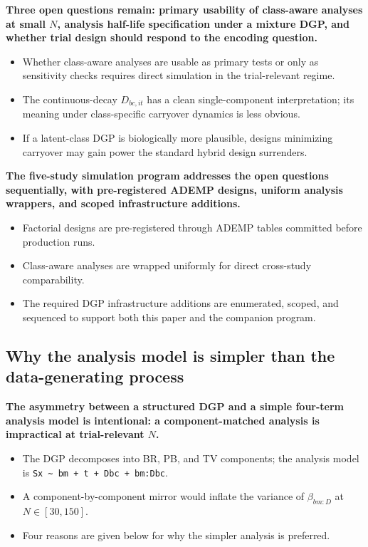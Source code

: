 \documentclass[
  11pt,
]{article}
\begin{document}
\textbf{Three open questions remain: primary usability of class-aware
analyses at small $N$, analysis half-life specification under a mixture
DGP, and whether trial design should respond to the encoding question.}

\begin{itemize}\setlength{\itemsep}{2pt}\setlength{\parskip}{0pt}
\item Whether class-aware analyses are usable as primary tests or
  only as sensitivity checks requires direct simulation in the
  trial-relevant regime.
\item The continuous-decay $D_{bc,it}$ has a clean single-component
  interpretation; its meaning under class-specific carryover
  dynamics is less obvious.
\item If a latent-class DGP is biologically more plausible, designs
  minimizing carryover may gain power the standard hybrid design
  surrenders.
\end{itemize}

\textbf{The five-study simulation program addresses the open
questions sequentially, with pre-registered ADEMP designs, uniform
analysis wrappers, and scoped infrastructure additions.}

\begin{itemize}\setlength{\itemsep}{2pt}\setlength{\parskip}{0pt}
\item Factorial designs are pre-registered through ADEMP tables
  committed before production runs.
\item Class-aware analyses are wrapped uniformly for direct
  cross-study comparability.
\item The required DGP infrastructure additions are enumerated,
  scoped, and sequenced to support both this paper and the companion
  program.
\end{itemize}

\subsection{Why the analysis model is simpler than the data-generating process}\label{why-the-analysis-model-is-simpler-than-the-data-generating-process}

\textbf{The asymmetry between a structured DGP and a simple four-term
analysis model is intentional: a component-matched analysis is
impractical at trial-relevant $N$.}

\begin{itemize}\setlength{\itemsep}{2pt}\setlength{\parskip}{0pt}
\item The DGP decomposes into BR, PB, and TV components; the analysis
  model is \texttt{Sx \textasciitilde{} bm + t + Dbc + bm:Dbc}.
\item A component-by-component mirror would inflate the variance of
  $\beta_{bm:D}$ at $N \in [30,150]$.
\item Four reasons are given below for why the simpler analysis is
  preferred.
\end{itemize}
\end{document}
